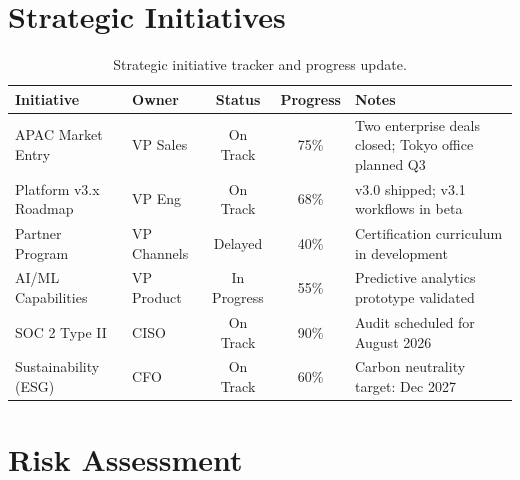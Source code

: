 \documentclass[
    language=english,
    doctype=quarterly-report,
    institution=none,
]{../../omnilatex}
\begin{document}
\section{Strategic Initiatives}

\begin{table}[h]
    \centering
    \begin{tabular}{llccp{4.5cm}}
        \toprule
        \textbf{Initiative} & \textbf{Owner} & \textbf{Status} & \textbf{Progress} & \textbf{Notes} \\
        \midrule
        APAC Market Entry    & VP Sales     & \cellcolor{green!20}On Track  & 75\% & Two enterprise deals closed; Tokyo office planned Q3 \\
        Platform v3.x Roadmap & VP Eng      & \cellcolor{green!20}On Track  & 68\% & v3.0 shipped; v3.1 workflows in beta \\
        Partner Program      & VP Channels  & \cellcolor{yellow!20}Delayed  & 40\% & Certification curriculum in development \\
        AI/ML Capabilities   & VP Product   & \cellcolor{yellow!20}In Progress & 55\% & Predictive analytics prototype validated \\
        SOC 2 Type II        & CISO         & \cellcolor{green!20}On Track  & 90\% & Audit scheduled for August 2026 \\
        Sustainability (ESG) & CFO          & \cellcolor{green!20}On Track  & 60\% & Carbon neutrality target: Dec 2027 \\
        \bottomrule
    \end{tabular}
    \caption{Strategic initiative tracker and progress update.}
\end{table}

\section{Risk Assessment}
\end{document}
